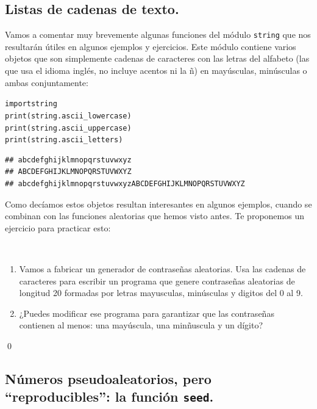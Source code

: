 \documentclass[10pt,a4paper]{article}\usepackage[]{graphicx}\usepackage[]{color}
\makeatletter
\newenvironment{kframe}{%
 \def\at@end@of@kframe{}%
 \ifinner\ifhmode%
  \def\at@end@of@kframe{\end{minipage}}%
  \begin{minipage}{\columnwidth}%
 \fi\fi%
 \def\FrameCommand##1{\hskip\@totalleftmargin \hskip-\fboxsep
 \colorbox{shadecolor}{##1}\hskip-\fboxsep
     \hskip-\linewidth \hskip-\@totalleftmargin \hskip\columnwidth}%
 \MakeFramed {\advance\hsize-\width
   \@totalleftmargin\z@ \linewidth\hsize
   \@setminipage}}%
 {\par\unskip\endMakeFramed%
 \at@end@of@kframe}
\newenvironment{knitrout}{}{} %
\newcounter {cont01}
\makeatother
\begin{document}
\subsection{Listas de cadenas de texto. }

Vamos a comentar muy brevemente algunas funciones del módulo {\tt string} que nos resultarán útiles en algunos ejemplos y ejercicios. Este módulo contiene varios objetos que son simplemente cadenas de caracteres con las letras del alfabeto (las que usa el idioma inglés, no incluye acentos ni la ñ) en mayúsculas, minúsculas o ambas conjuntamente:
\begin{knitrout}
\color{fgcolor}\begin{kframe}
\begin{alltt}
import string
print(string.ascii_lowercase)
print(string.ascii_uppercase)
print(string.ascii_letters)
\end{alltt}

\begin{verbatim}
## abcdefghijklmnopqrstuvwxyz
## ABCDEFGHIJKLMNOPQRSTUVWXYZ
## abcdefghijklmnopqrstuvwxyzABCDEFGHIJKLMNOPQRSTUVWXYZ
\end{verbatim}
\end{kframe}
\end{knitrout}
Como decíamos estos objetos resultan interesantes en algunos ejemplos, cuando se combinan con las funciones aleatorias que hemos visto antes. Te proponemos un ejercicio para practicar esto:
\begin{ejercicio}
\label{tut02:ejercicio27}
\quad\\
\begin{enumerate}
\item Vamos a fabricar un generador de contraseñas aleatorias. Usa las cadenas de caracteres para escribir un programa que genere contraseñas aleatorias de longitud 20 formadas por letras mayusculas, minúsculas y digitos del 0 al 9.
\item ¿Puedes modificar ese programa para garantizar que las contraseñas contienen al menos: una mayúscula, una minñuscula y un dígito?
\end{enumerate}
\qed
\end{ejercicio}

\subsection{Números pseudoaleatorios, pero ``reproducibles'': la función {\tt seed}.}
\label{tut02:subsec:numerosAleatoriosReproduciblesSeed}
\end{document}
